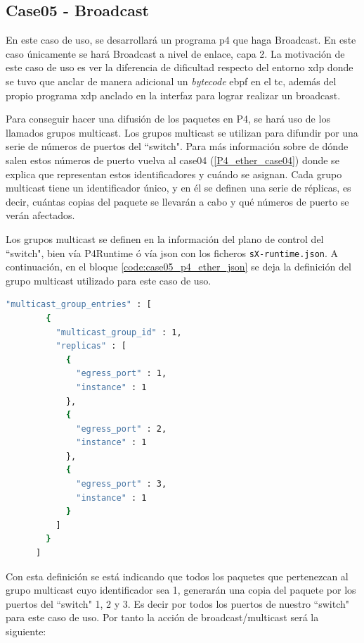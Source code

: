 \subsection{Case05 - Broadcast}
\label{P4_ether_case05}

En este caso de uso, se desarrollará un programa p4 que haga Broadcast. En este caso únicamente se hará Broadcast a nivel de enlace, capa 2. La motivación de este caso de uso es ver la diferencia de dificultad respecto del entorno \gls{xdp} donde se tuvo que anclar de manera adicional un \textit{bytecode} e\gls{bpf} en el \gls{tc}, además del propio programa \gls{xdp} anclado en la interfaz para lograr realizar un broadcast.\\
\par

Para conseguir hacer una difusión de los paquetes en P4, se hará uso de los llamados grupos multicast. Los grupos multicast se utilizan para difundir por una serie de números de puertos del ``switch". Para más información sobre de dónde salen estos números de puerto vuelva al case04 (\ref{P4_ether_case04}) donde se explica que representan estos identificadores y cuándo se asignan. Cada grupo multicast tiene un identificador único, y en él se definen una serie de réplicas, es decir, cuántas copias del paquete se llevarán a cabo y qué números de puerto se verán afectados.\\
\par

Los grupos multicast se definen en la información del plano de control del ``switch", bien vía P4Runtime ó vía json con los ficheros \texttt{sX-runtime.json}. A continuación, en el bloque \ref{code:case05_p4_ether_json} se deja la definición del grupo multicast utilizado para este caso de uso.  

\begin{lstlisting}[language= bash, style=Consola, caption={Ejemplo Json Grupo Multicast - Case05},label=code:case05_p4_ether_json]
    "multicast_group_entries" : [
        {
          "multicast_group_id" : 1,
          "replicas" : [
            {
              "egress_port" : 1,
              "instance" : 1
            },
            {
              "egress_port" : 2,
              "instance" : 1
            },
            {
              "egress_port" : 3,
              "instance" : 1
            }
          ]
        }
      ]
\end{lstlisting}
\vspace{0.5cm}

Con esta definición se está indicando que todos los paquetes que pertenezcan al grupo multicast cuyo identificador sea 1, generarán una copia del paquete por los puertos del ``switch" 1, 2 y 3. Es decir por todos los puertos de nuestro ``switch" para este caso de uso. Por tanto la acción de broadcast/multicast será la siguiente:

